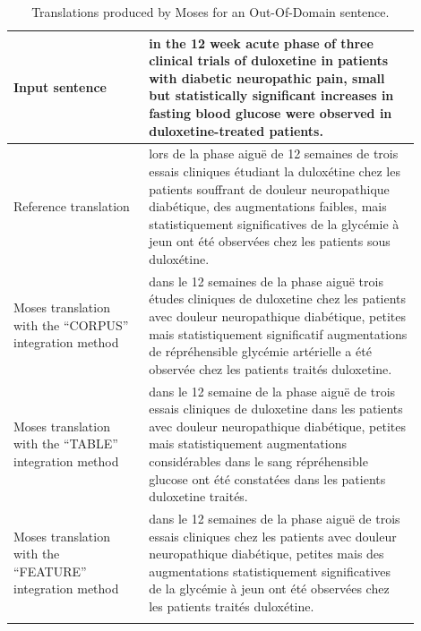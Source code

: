 \documentclass[output=paper,modfonts,nonflat]{langsci/langscibook}
\begin{document}
\begin{table}
\caption{Translations produced by Moses for an Out-Of-Domain sentence.}
\label{tab:SMT_ex2}
\small
\centering
 \begin{tabular}{p{0.3\linewidth}p{0.6\linewidth}} 
  \lsptoprule
Input sentence & in the 12 week acute phase of three clinical trials of duloxetine in patients with diabetic neuropathic pain, small but statistically significant increases in fasting blood glucose were observed in duloxetine-treated patients. \\
  \midrule
Reference translation & lors de la phase aiguë de 12 semaines de trois essais cliniques étudiant la duloxétine chez les patients souffrant de douleur neuropathique diabétique, des augmentations faibles, mais statistiquement significatives de la glycémie à jeun ont été observées chez les patients sous duloxétine. \\
  \midrule
Moses translation with the ``CORPUS'' integration method & dans le 12 semaines de la phase aiguë trois études cliniques de duloxetine chez les patients avec douleur neuropathique diabétique, petites mais statistiquement significatif augmentations de répréhensible glycémie artérielle a été observée chez les patients traités duloxetine.\\
  \midrule
Moses translation with the ``TABLE'' integration method & dans le 12 semaine de la phase aiguë de trois essais cliniques de duloxetine dans les patients avec douleur neuropathique diabétique, petites mais statistiquement augmentations considérables dans le sang répréhensible glucose ont été constatées dans les patients duloxetine traités.\\
  \midrule
Moses translation with the ``FEATURE'' integration method & dans le 12 semaines de la phase aiguë de trois essais cliniques chez les patients avec douleur neuropathique diabétique, petites mais des augmentations statistiquement significatives de la glycémie à jeun ont été observées chez les patients traités duloxétine.\\
  \lspbottomrule
 \end{tabular}
\end{table}
\end{document}
